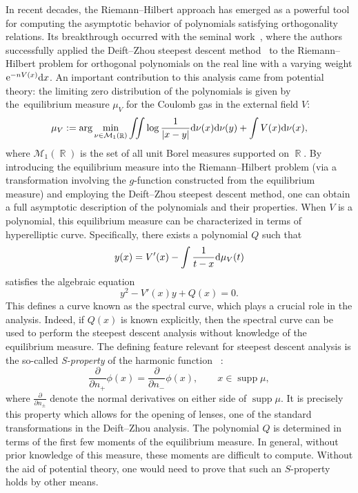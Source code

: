 \documentclass[pdftex]{sigma}
\DeclareMathOperator{\RR}{\mathbb{R}}
\numberwithin{equation}{section}
\begin{document}
In recent decades, the Riemann--Hilbert approach has emerged as a powerful tool for computing the asymptotic behavior of polynomials satisfying orthogonality relations. Its breakthrough occurred with the seminal work~\cite{DKMVZ}, where the authors successfully applied the Deift--Zhou steepest descent method~\cite{Deift-Zhou} to the Riemann--Hilbert problem for orthogonal polynomials on the real line with a varying weight ${\rm e}^{-nV(x)}{\rm d}x$. An important contribution to this analysis came from potential theory: the limiting zero distribution of the polynomials is given by the~equilibrium measure $\mu_V$ for the Coulomb gas in the external field $V$:
 \begin{equation*}
 \mu_{V} := \arg \min_{\nu\in \mathcal{M}_1(\RR)} \iint \log \frac{1}{|x-y|} {\rm d}\nu(x){\rm d}\nu(y) + \int V(x) {\rm d}\nu(x),
 \end{equation*}
where $\mathcal{M}_1(\RR)$ is the set of all unit Borel measures supported on $\RR$.
By introducing the equilibrium measure into the Riemann--Hilbert problem (via a transformation involving the $g$-function constructed from the equilibrium measure) and employing the Deift--Zhou steepest descent method, one can obtain a full asymptotic description of the polynomials and their properties. When $V$ is a polynomial, this equilibrium measure can be characterized in terms of hyperelliptic curve. Specifically, there exists a polynomial $Q$ such that
\begin{equation} \label{eq:1myx}
 y(x)=V'(x)- \int \frac{1}{t-x}{\rm d}\mu_V(t)
\end{equation}
satisfies the algebraic equation
\begin{equation*}
 y^2-V'(x)y+Q(x)=0.
\end{equation*}
This defines a curve known as the spectral curve, which plays a crucial role in the analysis. Indeed, if $Q(x)$ is known explicitly, then the spectral curve can be used to perform the steepest descent analysis without knowledge of the equilibrium measure. The defining feature relevant for steepest descent analysis is the so-called \textit{S-property} of the harmonic function ~\cite{KS}:
 \begin{equation*}
 \frac{\partial}{\partial n_+} \phi(x) = \frac{\partial}{\partial n_-} \phi(x), \qquad x\in \operatorname{supp}\mu,
 \end{equation*}
where $\frac{\partial}{\partial n_{\pm}}$ denote the normal derivatives on either side of $\operatorname{supp}\mu$.
 It is precisely this property which allows for the opening of lenses, one of the standard transformations in the Deift--Zhou analysis. The polynomial $Q$ is determined in terms of the first few moments of the equilibrium measure. In general, without prior knowledge of this measure, these moments are difficult to compute. Without the aid of potential theory, one would need to prove that such an $S$-property holds by other means.
\end{document}
